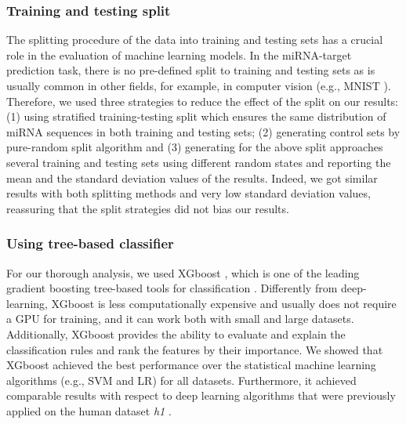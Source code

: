 \documentclass{bmcart}
\begin{document}
\subsubsection*{Training and testing split} 
The splitting procedure of the data into training and testing sets has a crucial role in the evaluation of machine learning models. In the miRNA-target prediction task, there is no pre-defined split to training and testing sets as is usually common in other fields, for example, in computer vision (e.g., MNIST \cite{mnist10027939599}). Therefore, we used three strategies to reduce the effect of the split on our results: (1) using stratified training-testing split which ensures the same distribution of miRNA sequences in both training and testing sets; (2) generating control sets by pure-random split algorithm and (3) generating for the above split approaches several training and testing sets using different random states and reporting the mean and the standard deviation values of the results. Indeed, we got similar results with both splitting methods and very low standard deviation values, reassuring that the split strategies did not bias our results.

\subsubsection*{Using tree-based classifier} 
For our thorough analysis, we used XGboost \cite{xgboost}, which is one of the leading gradient boosting tree-based tools for classification \cite{nielsen2016tree}. Differently from deep-learning, XGboost is less computationally expensive and usually does not require a GPU for training, and it can work both with small and large datasets. Additionally, XGboost provides the ability to evaluate and explain the classification rules and rank the features by their importance. 
We showed that XGboost achieved the best performance over the statistical machine learning algorithms (e.g., SVM and LR) for all datasets. Furthermore, it achieved comparable results with respect to deep learning algorithms that were previously applied on the human dataset \textit{h1} \cite{wen2018deepmirtar, lee2016deeptarget}.
\end{document}
